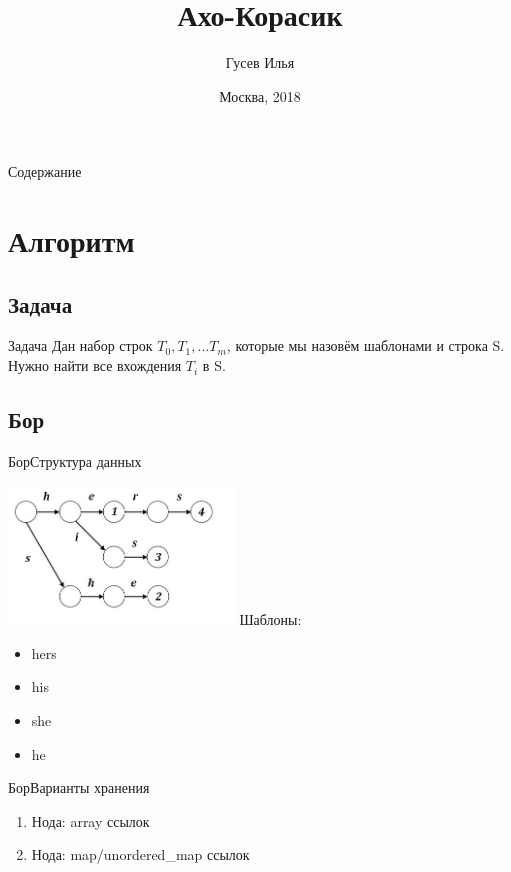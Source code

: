 \documentclass[10pt]{beamer}
\title[\href{https://goo.gl/NRgp8K}{https://goo.gl/NRgp8K} (Term 3)]{Ахо-Корасик}
\author[Гусев Илья]{Гусев Илья}
\institute[МФТИ] 
{Московский физико-технический институт\\*}
\date{Москва, 2018}
\begin{document}
\begin{frame}
  \titlepage
\end{frame}

\begin{frame}{Содержание}
\tableofcontents
\end{frame}

\section{Алгоритм}
\subsection{Задача}
\begin{frame}[fragile]{Задача}
Дан набор строк $T_0, T_1, ... T_m$, которые мы назовём шаблонами и строка S. Нужно найти все вхождения $T_i$  в S.  
\end{frame}

\subsection{Бор}
\begin{frame}[fragile]{Бор}{Структура данных}
\begin{multicols}{2}
\includegraphics[width=6cm, height=3.7cm]{Term_3/Source/Pictures/bor.jpg}
\vfill\eject
Шаблоны:
\begin{itemize}
    \item hers\\
    \item his\\
    \item she\\
    \item he\\
\end{itemize}
\end{multicols}
\end{frame}

\begin{frame}[fragile]{Бор}{Варианты хранения}
\begin{enumerate}
    \item Нода: array ссылок
    \item Нода: map/unordered\_map ссылок
\end{enumerate}
\end{frame}
\end{document}
